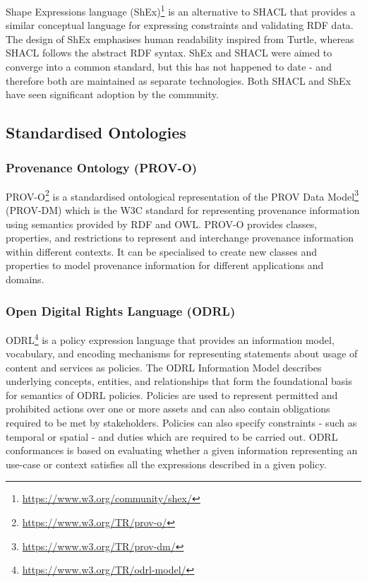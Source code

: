 Shape Expressions language (ShEx)\footnote{\url{https://www.w3.org/community/shex/}} is an alternative to SHACL that provides a similar conceptual language for expressing constraints and validating RDF data. The design of ShEx emphasises human readability inspired from Turtle, whereas SHACL follows the abstract RDF syntax. ShEx and SHACL were aimed to converge into a common standard, but this has not happened to date - and therefore both are maintained as separate technologies. Both SHACL and ShEx have seen significant adoption by the community.

\subsection{Standardised Ontologies}
\subsubsection{Provenance Ontology (PROV-O)}
PROV-O\footnote{\url{https://www.w3.org/TR/prov-o/}} is a standardised ontological representation of the PROV Data Model\footnote{\url{https://www.w3.org/TR/prov-dm/}} (PROV-DM) which is the W3C standard for representing provenance information using semantics provided by RDF and OWL.
PROV-O provides classes, properties, and restrictions to represent and interchange provenance information within different contexts.
It can be specialised to create new classes and properties to model provenance information for different applications and domains.

\subsubsection{Open Digital Rights Language (ODRL)}
ODRL\footnote{\url{https://www.w3.org/TR/odrl-model/}} is a policy expression language that provides an information model, vocabulary, and encoding mechanisms for representing statements about usage of content and services as policies. The ODRL Information Model describes underlying concepts, entities, and relationships that form the foundational basis for semantics of ODRL policies.
Policies are used to represent permitted and prohibited actions over one or more assets and can also contain obligations required to be met by stakeholders.
Policies can also specify constraints - such as temporal or spatial - and duties which are required to be carried out.
ODRL conformances is based on evaluating whether a given information representing an use-case or context satisfies all the expressions described in a given policy.